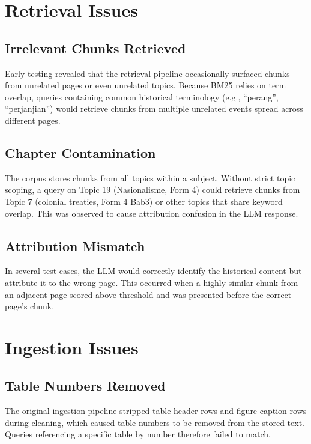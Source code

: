 \documentclass[12pt, a4paper]{report}
\begin{document}
\section{Retrieval Issues}

\subsection{Irrelevant Chunks Retrieved}

Early testing revealed that the retrieval pipeline occasionally surfaced chunks
from unrelated pages or even unrelated topics. Because BM25 relies on term
overlap, queries containing common historical terminology (e.g., ``perang'',
``perjanjian'') would retrieve chunks from multiple unrelated events spread
across different pages.

\subsection{Chapter Contamination}

The corpus stores chunks from all topics within a subject. Without strict topic
scoping, a query on Topic 19 (Nasionalisme, Form 4) could retrieve chunks from
Topic 7 (colonial treaties, Form 4 Bab3) or other topics that share keyword
overlap. This was observed to cause attribution confusion in the LLM response.

\subsection{Attribution Mismatch}

In several test cases, the LLM would correctly identify the historical content
but attribute it to the wrong page. This occurred when a highly similar chunk
from an adjacent page scored above threshold and was presented before the
correct page's chunk.

\section{Ingestion Issues}

\subsection{Table Numbers Removed}

The original ingestion pipeline stripped table-header rows and figure-caption
rows during cleaning, which caused table numbers to be removed from the stored
text. Queries referencing a specific table by number therefore failed to match.
\end{document}
